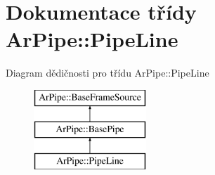 \hypertarget{class_ar_pipe_1_1_pipe_line}{\section{Dokumentace třídy Ar\-Pipe\-:\-:Pipe\-Line}
\label{de/d52/class_ar_pipe_1_1_pipe_line}
}
Diagram dědičnosti pro třídu Ar\-Pipe\-:\-:Pipe\-Line\begin{figure}[H]
\begin{center}
\leavevmode
\includegraphics[height=3.000000cm]{de/d52/class_ar_pipe_1_1_pipe_line}
\end{center}
\end{figure}
